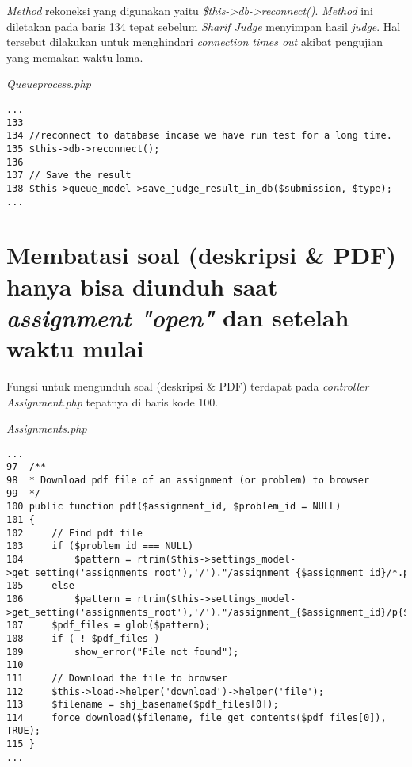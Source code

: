 \textit{Method} rekoneksi yang digunakan yaitu \textit{\$this->db->reconnect()}. \textit{Method} ini diletakan pada baris 134 tepat sebelum \textit{Sharif Judge} menyimpan hasil \textit{judge}. Hal tersebut dilakukan untuk menghindari \textit{connection times out} akibat pengujian yang memakan waktu lama.

\textit{Queueprocess.php}
\begin{lstlisting}[basicstyle=\ttfamily, frame=single,
columns=fullflexible, keepspaces=true]
...
133
134	//reconnect to database incase we have run test for a long time.
135	$this->db->reconnect();
136
137	// Save the result
138	$this->queue_model->save_judge_result_in_db($submission, $type);
...
\end{lstlisting}

\section{Membatasi soal (deskripsi \& PDF) hanya bisa diunduh saat \textit{assignment "open"} dan setelah waktu mulai}
Fungsi untuk mengunduh soal (deskripsi \& PDF) terdapat pada \textit{controller Assignment.php} tepatnya di baris kode 100.

\textit{Assignments.php}
\begin{lstlisting}[basicstyle=\ttfamily, frame=single,
columns=fullflexible, keepspaces=true, breaklines=true]
...
97	/**
98	* Download pdf file of an assignment (or problem) to browser
99	*/
100	public function pdf($assignment_id, $problem_id = NULL)
101	{
102		// Find pdf file
103		if ($problem_id === NULL)
104			$pattern = rtrim($this->settings_model->get_setting('assignments_root'),'/')."/assignment_{$assignment_id}/*.pdf";
105		else
106			$pattern = rtrim($this->settings_model->get_setting('assignments_root'),'/')."/assignment_{$assignment_id}/p{$problem_id}/*.pdf";
107		$pdf_files = glob($pattern);
108		if ( ! $pdf_files )
109			show_error("File not found");
110
111		// Download the file to browser
112		$this->load->helper('download')->helper('file');
113		$filename = shj_basename($pdf_files[0]);
114		force_download($filename, file_get_contents($pdf_files[0]), TRUE);
115	}
...
\end{lstlisting}

